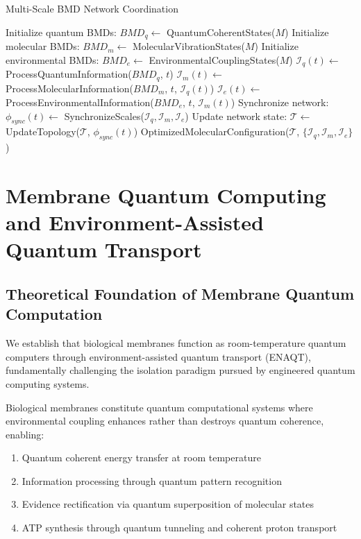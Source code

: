 ﻿\documentclass[11pt,a4paper]{article}
\begin{document}
\begin{algorithm}
\caption{Multi-Scale BMD Network Coordination}
\begin{algorithmic}
    \State Initialize quantum BMDs: $BMD_q \leftarrow$ QuantumCoherentStates($M$)
    \State Initialize molecular BMDs: $BMD_m \leftarrow$ MolecularVibrationStates($M$)
    \State Initialize environmental BMDs: $BMD_e \leftarrow$ EnvironmentalCouplingStates($M$)
        \State $\mathcal{I}_q(t) \leftarrow$ ProcessQuantumInformation($BMD_q$, $t$)
        \State $\mathcal{I}_m(t) \leftarrow$ ProcessMolecularInformation($BMD_m$, $t$, $\mathcal{I}_q(t)$)
        \State $\mathcal{I}_e(t) \leftarrow$ ProcessEnvironmentalInformation($BMD_e$, $t$, $\mathcal{I}_m(t)$)
        \State Synchronize network: $\phi_{sync}(t) \leftarrow$ SynchronizeScales($\mathcal{I}_q, \mathcal{I}_m, \mathcal{I}_e$)
        \State Update network state: $\mathcal{T} \leftarrow$ UpdateTopology($\mathcal{T}$, $\phi_{sync}(t)$)
    \EndFor
    \State \Return OptimizedMolecularConfiguration($\mathcal{T}$, $\{\mathcal{I}_q, \mathcal{I}_m, \mathcal{I}_e\}$)
\EndProcedure
\end{algorithmic}
\end{algorithm}

\section{Membrane Quantum Computing and Environment-Assisted Quantum Transport}

\subsection{Theoretical Foundation of Membrane Quantum Computation}

We establish that biological membranes function as room-temperature quantum computers through environment-assisted quantum transport (ENAQT), fundamentally challenging the isolation paradigm pursued by engineered quantum computing systems.

\begin{theorem}
Biological membranes constitute quantum computational systems where environmental coupling enhances rather than destroys quantum coherence, enabling:
\begin{enumerate}
\item Quantum coherent energy transfer at room temperature
\item Information processing through quantum pattern recognition
\item Evidence rectification via quantum superposition of molecular states
\item ATP synthesis through quantum tunneling and coherent proton transport
\end{enumerate}
\end{theorem}
\end{document}
